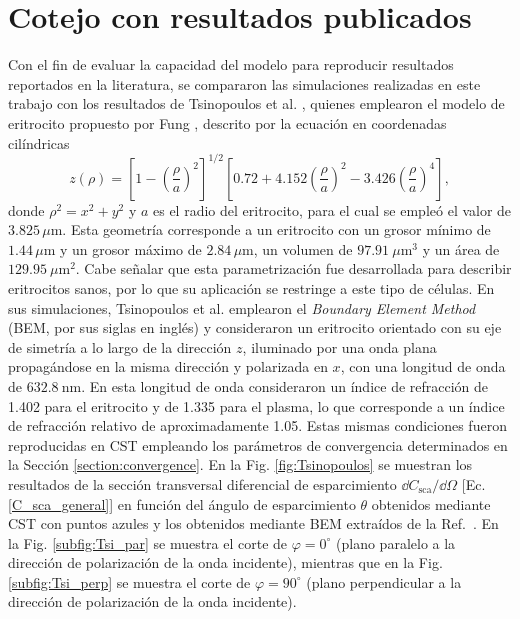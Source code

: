 \section{Cotejo con resultados publicados}
\label{section:Res_literatura}
\vspace{-0.3cm}

Con el fin de evaluar la capacidad del modelo para reproducir resultados reportados en la literatura, se compararon las simulaciones realizadas en este trabajo con los resultados de Tsinopoulos et al. \cite{tsinopoulosLightScatteringAggregated2002}, quienes emplearon el modelo de eritrocito propuesto por Fung \cite{fungBiomechanicsMechanicalProperties1990}, descrito por la ecuación en coordenadas cilíndricas
%
\begin{equation}
	z(\rho)=\left[1-\left(\dfrac{\rho}{a}\right)^2\right]^{1/2}\left[0.72+4.152\left(\dfrac{\rho}{a}\right)^2-3.426\left(\dfrac{\rho}{a}\right)^4\right],
	\label{eq:Tsang_eri}
\end{equation}
%
donde $\rho^2=x^2+y^2$ y $a$ es el radio del eritrocito, para el cual se empleó el valor de $3.825\,\mu$m. Esta geometría corresponde a un eritrocito con un grosor mínimo de $1.44\,\mu$m y un grosor máximo de $2.84\,\mu$m, un volumen de $97.91~\mu\text{m}^3$ y un área de $129.95~\mu\text{m}^2$. Cabe señalar que esta parametrización fue desarrollada para describir eritrocitos sanos, por lo que su aplicación se restringe a este tipo de células. En sus simulaciones, Tsinopoulos et al. emplearon el \textit{Boundary Element Method} (BEM, por sus siglas en inglés) y consideraron un eritrocito orientado con su eje de simetría a lo largo de la dirección $z$, iluminado por una onda plana propagándose en la misma dirección y polarizada en $x$, con una longitud de onda de $632.8~\text{nm}$. En esta longitud de onda consideraron un índice de refracción de 1.402 para el eritrocito y de 1.335 para el plasma, lo que corresponde a un índice de refracción relativo de aproximadamente 1.05. Estas mismas condiciones fueron reproducidas en CST empleando los parámetros de convergencia determinados en la Sección \ref{section:convergence}. En la Fig. \ref{fig:Tsinopoulos} se muestran los resultados de la sección transversal diferencial de esparcimiento $\dd{C_{\text{sca}}/\dd{\Omega}}$ [Ec. \eqref{C_sca_general}] en función del ángulo de esparcimiento $\theta$  obtenidos mediante CST con puntos azules y los obtenidos mediante BEM extraídos de la Ref.~\cite{tsinopoulosLightScatteringAggregated2002}. En la Fig. \ref{subfig:Tsi_par} se muestra el corte de $\varphi=0^{\circ}$ (plano paralelo a la dirección de polarización de la onda incidente), mientras que en la Fig. \ref{subfig:Tsi_perp} se muestra el corte de $\varphi=90^{\circ}$ (plano perpendicular a la dirección de polarización de la onda incidente). %
